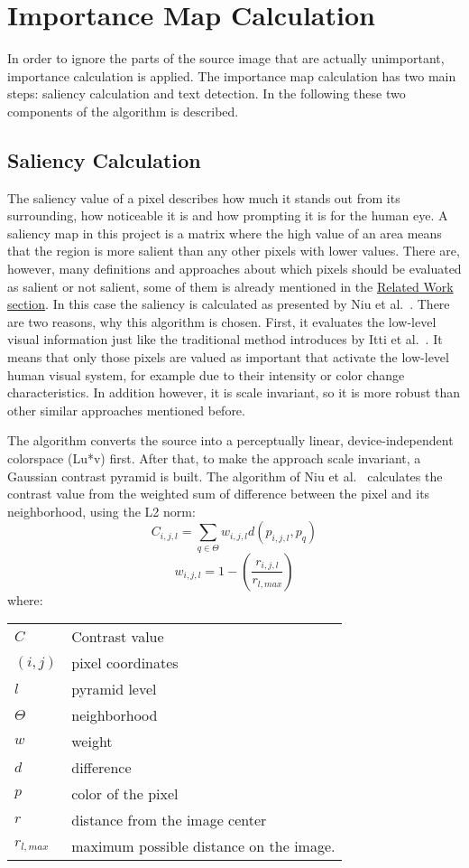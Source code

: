 \documentclass[draft,final]{vutinfth} %
\makeatletter
\newenvironment{conditions}
{\par\vspace{\abovedisplayskip}\noindent\begin{tabular}{>{$}l<{$} @{${}:{}$} l}}
	{\end{tabular}\par\vspace{\belowdisplayskip}}
\makeatother
\begin{document}
	\section{Importance Map Calculation}
	In order to ignore the parts of the source image that are actually unimportant, importance calculation is applied.
	The importance map calculation has two main steps: saliency calculation and text detection.
	In the following these two components of the algorithm is described.
	\subsection{Saliency Calculation}
	\label{saliencyCalculation}
	The saliency value of a pixel describes how much it stands out from its surrounding, how noticeable it is and how prompting it is for the human eye.
	A saliency map in this project is a matrix where the high value of an area means that the region is more salient than any other pixels with lower values.
	There are, however, many definitions and approaches about which pixels should be evaluated as salient or not salient, some of them is already mentioned in the \hyperref[relatedWork:resampling]{Related Work section}.
	In this case the saliency is calculated as presented by Niu et al.~\cite{niu2012image}. 
	There are two reasons, why this algorithm is chosen.
	First, it evaluates the low-level visual information just like the traditional method introduces by Itti et al.~\cite{itti1998model}.
	It means that only those pixels are valued as important that activate the low-level human visual system, for example due to their intensity or color change characteristics.
	In addition however, it is scale invariant, so it is more robust than other similar approaches mentioned before.\par 
	The algorithm converts the source into a perceptually linear, device-independent colorspace (Lu*v) first.
	After that, to make the approach scale invariant, a Gaussian contrast pyramid is built.
	The algorithm of Niu et al.~\cite{niu2012image} calculates the contrast value from the weighted sum of difference between the pixel and its neighborhood, using the L2 norm:
	\[ C_{i,j,l}=\sum\limits_{q\in\Theta}w_{i,j,l}d(p_{i,j,l},p_{q}) \]
	\[ w_{i,j,l}=1-\left(\frac{r_{i,j,l}}{r_{l,max}}\right) \]
	where:
	\begin{center}
		\begin{conditions}
			C & Contrast value \\
			(i, j) & pixel coordinates \\
			l & pyramid level \\
			\Theta & neighborhood \\
			w & weight \\
			d & difference \\
			p & color of the pixel \\
			r & distance from the image center \\
			r_{l, max} & maximum possible distance on the image.
		\end{conditions}
	\end{center}
\end{document}
